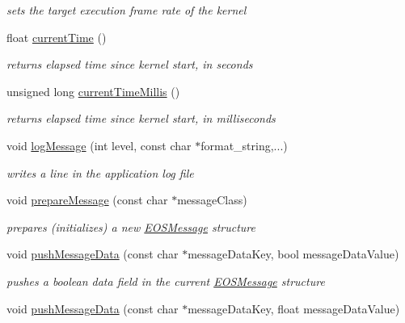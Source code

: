 \begin{CompactItemize}
\begin{CompactList}\small\item\em sets the target execution frame rate of the kernel \item\end{CompactList}\item 
float \hyperlink{structEOSKernel_68610ced573efe86f7db3ca176590793}{currentTime} ()
\begin{CompactList}\small\item\em returns elapsed time since kernel start, in seconds \item\end{CompactList}\item 
unsigned long \hyperlink{structEOSKernel_2b1e8769e99c2af88e199534c1cc694b}{currentTimeMillis} ()
\begin{CompactList}\small\item\em returns elapsed time since kernel start, in milliseconds \item\end{CompactList}\item 
void \hyperlink{structEOSKernel_3901b7994589931f6d409a3a7f42dae2}{logMessage} (int level, const char $\ast$format\_\-string,...)
\begin{CompactList}\small\item\em writes a line in the application log file \item\end{CompactList}\item 
void \hyperlink{structEOSKernel_5a647f0ff07643959bebac4408d6c105}{prepareMessage} (const char $\ast$messageClass)
\begin{CompactList}\small\item\em prepares (initializes) a new \hyperlink{classEOSMessage}{EOSMessage} structure \item\end{CompactList}\item 
void \hyperlink{structEOSKernel_335409b15526d516a8051199cc7fa619}{pushMessageData} (const char $\ast$messageDataKey, bool messageDataValue)
\begin{CompactList}\small\item\em pushes a boolean data field in the current \hyperlink{classEOSMessage}{EOSMessage} structure \item\end{CompactList}\item 
void \hyperlink{structEOSKernel_756f0c37601b7a9bc59832948a2b20ad}{pushMessageData} (const char $\ast$messageDataKey, float messageDataValue)

\end{CompactItemize}
